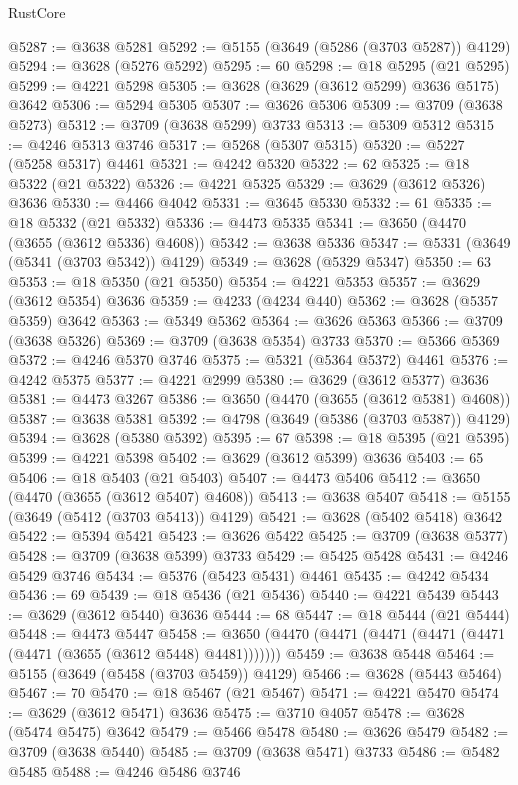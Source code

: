 \begin{lexlean}{RustCore}
\begin{coremodule}
@5287 := @3638 @5281
@5292 := @5155 (@3649 (@5286 (@3703 @5287)) @4129)
@5294 := @3628 (@5276 @5292)
@5295 := 60
@5298 := @18 @5295 (@21 @5295)
@5299 := @4221 @5298
@5305 := @3628 (@3629 (@3612 @5299) @3636 @5175) @3642
@5306 := @5294 @5305
@5307 := @3626 @5306
@5309 := @3709 (@3638 @5273)
@5312 := @3709 (@3638 @5299) @3733
@5313 := @5309 @5312
@5315 := @4246 @5313 @3746
@5317 := @5268 (@5307 @5315)
@5320 := @5227 (@5258 @5317) @4461
@5321 := @4242 @5320
@5322 := 62
@5325 := @18 @5322 (@21 @5322)
@5326 := @4221 @5325
@5329 := @3629 (@3612 @5326) @3636
@5330 := @4466 @4042
@5331 := @3645 @5330
@5332 := 61
@5335 := @18 @5332 (@21 @5332)
@5336 := @4473 @5335
@5341 := @3650 (@4470 (@3655 (@3612 @5336) @4608))
@5342 := @3638 @5336
@5347 := @5331 (@3649 (@5341 (@3703 @5342)) @4129)
@5349 := @3628 (@5329 @5347)
@5350 := 63
@5353 := @18 @5350 (@21 @5350)
@5354 := @4221 @5353
@5357 := @3629 (@3612 @5354) @3636
@5359 := @4233 (@4234 @440)
@5362 := @3628 (@5357 @5359) @3642
@5363 := @5349 @5362
@5364 := @3626 @5363
@5366 := @3709 (@3638 @5326)
@5369 := @3709 (@3638 @5354) @3733
@5370 := @5366 @5369
@5372 := @4246 @5370 @3746
@5375 := @5321 (@5364 @5372) @4461
@5376 := @4242 @5375
@5377 := @4221 @2999
@5380 := @3629 (@3612 @5377) @3636
@5381 := @4473 @3267
@5386 := @3650 (@4470 (@3655 (@3612 @5381) @4608))
@5387 := @3638 @5381
@5392 := @4798 (@3649 (@5386 (@3703 @5387)) @4129)
@5394 := @3628 (@5380 @5392)
@5395 := 67
@5398 := @18 @5395 (@21 @5395)
@5399 := @4221 @5398
@5402 := @3629 (@3612 @5399) @3636
@5403 := 65
@5406 := @18 @5403 (@21 @5403)
@5407 := @4473 @5406
@5412 := @3650 (@4470 (@3655 (@3612 @5407) @4608))
@5413 := @3638 @5407
@5418 := @5155 (@3649 (@5412 (@3703 @5413)) @4129)
@5421 := @3628 (@5402 @5418) @3642
@5422 := @5394 @5421
@5423 := @3626 @5422
@5425 := @3709 (@3638 @5377)
@5428 := @3709 (@3638 @5399) @3733
@5429 := @5425 @5428
@5431 := @4246 @5429 @3746
@5434 := @5376 (@5423 @5431) @4461
@5435 := @4242 @5434
@5436 := 69
@5439 := @18 @5436 (@21 @5436)
@5440 := @4221 @5439
@5443 := @3629 (@3612 @5440) @3636
@5444 := 68
@5447 := @18 @5444 (@21 @5444)
@5448 := @4473 @5447
@5458 := @3650 (@4470 (@4471 (@4471 (@4471 (@4471 (@4471 (@3655 (@3612 @5448) @4481)))))))
@5459 := @3638 @5448
@5464 := @5155 (@3649 (@5458 (@3703 @5459)) @4129)
@5466 := @3628 (@5443 @5464)
@5467 := 70
@5470 := @18 @5467 (@21 @5467)
@5471 := @4221 @5470
@5474 := @3629 (@3612 @5471) @3636
@5475 := @3710 @4057
@5478 := @3628 (@5474 @5475) @3642
@5479 := @5466 @5478
@5480 := @3626 @5479
@5482 := @3709 (@3638 @5440)
@5485 := @3709 (@3638 @5471) @3733
@5486 := @5482 @5485
@5488 := @4246 @5486 @3746

\end{coremodule}
\end{lexlean}
